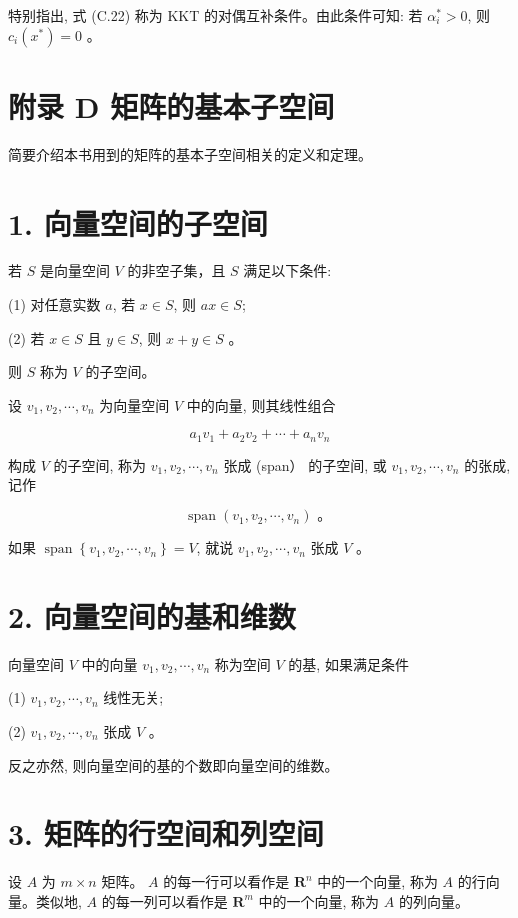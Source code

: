 \documentclass[10pt]{article}
\begin{document}
特别指出, 式 (C.22) 称为 KKT 的对偶互补条件。由此条件可知: 若 $\alpha_{i}^{*}>0$, 则 $c_{i}\left(x^{*}\right)=0$ 。

\section*{附录 D 矩阵的基本子空间}
简要介绍本书用到的矩阵的基本子空间相关的定义和定理。

\section*{1. 向量空间的子空间}
若 $S$ 是向量空间 $V$ 的非空子集，且 $S$ 满足以下条件:

(1) 对任意实数 $a$, 若 $x \in S$, 则 $a x \in S$;

(2) 若 $x \in S$ 且 $y \in S$, 则 $x+y \in S$ 。

则 $S$ 称为 $V$ 的子空间。

设 $v_{1}, v_{2}, \cdots, v_{n}$ 为向量空间 $V$ 中的向量, 则其线性组合

$$
a_{1} v_{1}+a_{2} v_{2}+\cdots+a_{n} v_{n}
$$

构成 $V$ 的子空间, 称为 $v_{1}, v_{2}, \cdots, v_{n}$ 张成 (span） 的子空间, 或 $v_{1}, v_{2}, \cdots, v_{n}$ 的张成, 记作

$$
\operatorname{span}\left(v_{1}, v_{2}, \cdots, v_{n}\right) \text { 。 }
$$

如果 $\operatorname{span}\left\{v_{1}, v_{2}, \cdots, v_{n}\right\}=V$, 就说 $v_{1}, v_{2}, \cdots, v_{n}$ 张成 $V$ 。

\section*{2. 向量空间的基和维数}
向量空间 $V$ 中的向量 $v_{1}, v_{2}, \cdots, v_{n}$ 称为空间 $V$ 的基, 如果满足条件

(1) $v_{1}, v_{2}, \cdots, v_{n}$ 线性无关;

(2) $v_{1}, v_{2}, \cdots, v_{n}$ 张成 $V$ 。

反之亦然, 则向量空间的基的个数即向量空间的维数。

\section*{3. 矩阵的行空间和列空间}
设 $A$ 为 $m \times n$ 矩阵。 $A$ 的每一行可以看作是 $\boldsymbol{R}^{n}$ 中的一个向量, 称为 $A$ 的行向量。类似地, $A$ 的每一列可以看作是 $\boldsymbol{R}^{m}$ 中的一个向量, 称为 $A$ 的列向量。
\end{document}

